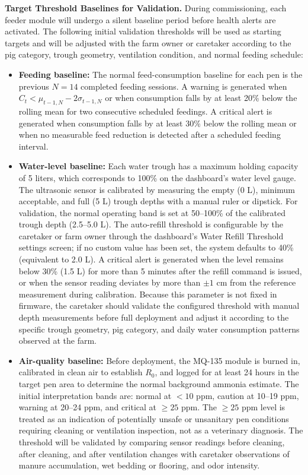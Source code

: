 \textbf{Target Threshold Baselines for Validation.} During commissioning, each feeder module will undergo a silent baseline period before health alerts are activated. The following initial validation thresholds will be used as starting targets and will be adjusted with the farm owner or caretaker according to the pig category, trough geometry, ventilation condition, and normal feeding schedule:
\begin{itemize}
  \item \textbf{Feeding baseline:} The normal feed-consumption baseline for each pen is the previous $N = 14$ completed feeding sessions. A warning is generated when $C_t < \mu_{t-1,N} - 2\sigma_{t-1,N}$ or when consumption falls by at least 20\% below the rolling mean for two consecutive scheduled feedings. A critical alert is generated when consumption falls by at least 30\% below the rolling mean or when no measurable feed reduction is detected after a scheduled feeding interval.
  \item \textbf{Water-level baseline:} Each water trough has a maximum holding capacity of 5 liters, which corresponds to 100\% on the dashboard's water level gauge. The ultrasonic sensor is calibrated by measuring the empty (0 L), minimum acceptable, and full (5 L) trough depths with a manual ruler or dipstick. For validation, the normal operating band is set at 50--100\% of the calibrated trough depth (2.5--5.0 L). The auto-refill threshold is configurable by the caretaker or farm owner through the dashboard's Water Refill Threshold settings screen; if no custom value has been set, the system defaults to 40\% (equivalent to 2.0 L). A critical alert is generated when the level remains below 30\% (1.5 L) for more than 5 minutes after the refill command is issued, or when the sensor reading deviates by more than $\pm 1$ cm from the reference measurement during calibration. Because this parameter is not fixed in firmware, the caretaker should validate the configured threshold with manual depth measurements before full deployment and adjust it according to the specific trough geometry, pig category, and daily water consumption patterns observed at the farm.
  \item \textbf{Air-quality baseline:} Before deployment, the MQ-135 module is burned in, calibrated in clean air to establish $R_0$, and logged for at least 24 hours in the target pen area to determine the normal background ammonia estimate. The initial interpretation bands are: normal at $<10$ ppm, caution at 10--19 ppm, warning at 20--24 ppm, and critical at $\geq25$ ppm. The $\geq25$ ppm level is treated as an indication of potentially unsafe or unsanitary pen conditions requiring cleaning or ventilation inspection, not as a veterinary diagnosis. The threshold will be validated by comparing sensor readings before cleaning, after cleaning, and after ventilation changes with caretaker observations of manure accumulation, wet bedding or flooring, and odor intensity.
\end{itemize}

